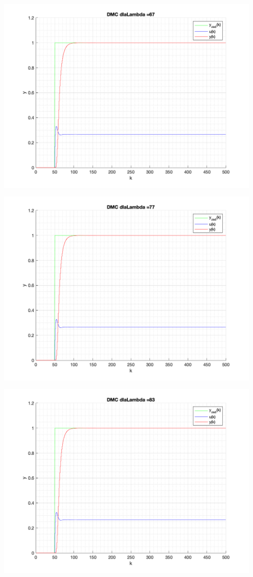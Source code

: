 \documentclass[a4paper, 11pt]{article}
\begin{document}
\begin{enumerate}
 \includegraphics[width=\linewidth]{./ModelsP4_Lambda/P4_DMC_Lambda_67_png.png} 
 
 \includegraphics[width=\linewidth]{./ModelsP4_Lambda/P4_DMC_Lambda_77_png.png} 
 
 \includegraphics[width=\linewidth]{./ModelsP4_Lambda/P4_DMC_Lambda_83_png.png} 
 

\end{enumerate}
\end{document}
